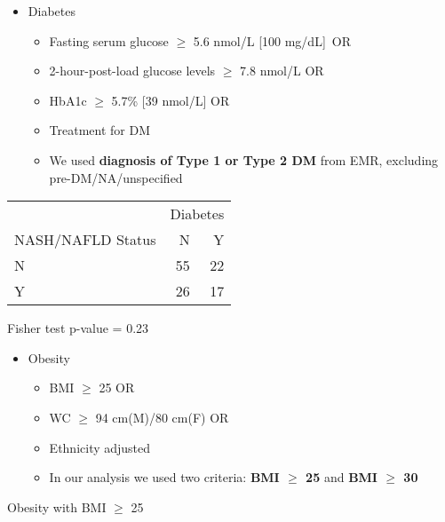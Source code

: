 \documentclass[
]{article}
\providecommand{\tightlist}{%
  \setlength{\itemsep}{0pt}\setlength{\parskip}{0pt}}
\begin{document}
\begin{itemize}
\tightlist
\item
  Diabetes

  \begin{itemize}
  \tightlist
  \item
    Fasting serum glucose \(\ge\) 5.6 nmol/L {[}100 mg/dL{]}~OR
  \item
    2-hour-post-load glucose levels \(\ge\) 7.8 nmol/L OR
  \item
    HbA1c \(\ge\) 5.7\% {[}39 nmol/L{]} OR
  \item
    Treatment for DM
  \item
    We used \textbf{diagnosis of Type 1 or Type 2 DM} from EMR,
    excluding pre-DM/NA/unspecified
  \end{itemize}
\end{itemize}

\begin{table}[!t]
\fontsize{12.0pt}{14.4pt}\selectfont
\begin{tabular*}{\linewidth}{@{\extracolsep{\fill}}l|rr}
\toprule
 & \multicolumn{2}{c}{Diabetes} \\ 
\cmidrule(lr){2-3}
NASH/NAFLD Status & N & Y \\ 
\midrule\addlinespace[2.5pt]
N & 55 & 22 \\ 
Y & 26 & 17 \\ 
\bottomrule
\end{tabular*}
\begin{minipage}{\linewidth}
Fisher test p-value =  0.23\\
\end{minipage}
\end{table}

\begin{itemize}
\tightlist
\item
  Obesity

  \begin{itemize}
  \tightlist
  \item
    BMI \(\ge\) 25 OR
  \item
    WC \(\ge\) 94 cm(M)/80 cm(F) OR
  \item
    Ethnicity adjusted
  \item
    In our analysis we used two criteria: \textbf{BMI \(\ge\) 25} and
    \textbf{BMI \(\ge\) 30}
  \end{itemize}
\end{itemize}

Obesity with BMI \(\ge\) 25
\end{document}
